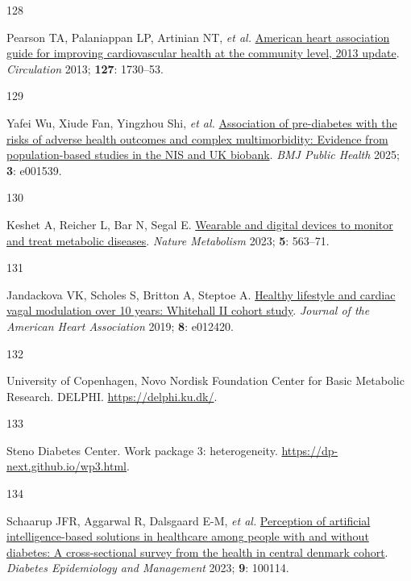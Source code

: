 \documentclass[
  a4paper,
  headsepline=true,
  open=any]{scrbook}
\newlength{\cslhangindent}
\newlength{\csllabelwidth}
\newlength{\cslentryspacingunit} %
\newenvironment{CSLReferences}[2] %
 {%
  \setlength{\parindent}{0pt}
  \ifodd #1
  \let\oldpar\par
  \def\par{\hangindent=\cslhangindent\oldpar}
  \fi
  \setlength{\parskip}{#2\cslentryspacingunit}
 }%
 {}
\newcommand{\CSLLeftMargin}[1]{\parbox[t]{\csllabelwidth}{#1}}
\newcommand{\CSLRightInline}[1]{\parbox[t]{\linewidth - \csllabelwidth}{#1}\break}
\begin{document}
\begin{CSLReferences}{0}{0}
\leavevmode{}%
\CSLLeftMargin{128 }%
\CSLRightInline{Pearson TA, Palaniappan LP, Artinian NT, \emph{et al.}
\href{https://doi.org/10.1161/CIR.0b013e31828f8a94}{American heart
association guide for improving cardiovascular health at the community
level, 2013 update}. \emph{Circulation} 2013; \textbf{127}: 1730--53.}

\leavevmode{}%
\CSLLeftMargin{129 }%
\CSLRightInline{Yafei Wu, Xiude Fan, Yingzhou Shi, \emph{et al.}
\href{https://doi.org/10.1136/bmjph-2024-001539}{Association of
pre-diabetes with the risks of adverse health outcomes and complex
multimorbidity: Evidence from population-based studies in the NIS and UK
biobank}. \emph{BMJ Public Health} 2025; \textbf{3}: e001539.}

\leavevmode{}%
\CSLLeftMargin{130 }%
\CSLRightInline{Keshet A, Reicher L, Bar N, Segal E.
\href{https://doi.org/10.1038/s42255-023-00778-y}{Wearable and digital
devices to monitor and treat metabolic diseases}. \emph{Nature
Metabolism} 2023; \textbf{5}: 563--71.}

\leavevmode{}%
\CSLLeftMargin{131 }%
\CSLRightInline{Jandackova VK, Scholes S, Britton A, Steptoe A.
\href{https://doi.org/10.1161/JAHA.119.012420}{Healthy lifestyle and
cardiac vagal modulation over 10 years: Whitehall II cohort study}.
\emph{Journal of the American Heart Association} 2019; \textbf{8}:
e012420.}

\leavevmode{}%
\CSLLeftMargin{132 }%
\CSLRightInline{University of Copenhagen, Novo Nordisk Foundation Center
for Basic Metabolic Research. DELPHI. \url{https://delphi.ku.dk/}.}

\leavevmode{}%
\CSLLeftMargin{133 }%
\CSLRightInline{Steno Diabetes Center. Work package 3: heterogeneity.
\url{https://dp-next.github.io/wp3.html}.}

\leavevmode{}%
\CSLLeftMargin{134 }%
\CSLRightInline{Schaarup JFR, Aggarwal R, Dalsgaard E-M, \emph{et al.}
\href{https://doi.org/10.1016/j.deman.2022.100114}{Perception of
artificial intelligence-based solutions in healthcare among people with
and without diabetes: A cross-sectional survey from the health in
central denmark cohort}. \emph{Diabetes Epidemiology and Management}
2023; \textbf{9}: 100114.}


\end{CSLReferences}
\end{document}
